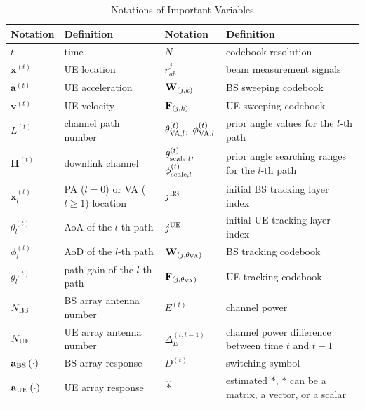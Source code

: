 \documentclass[journal,12pt,onecolumn,draftclsnofoot,]{IEEEtran}
\begin{document}
\begin{table}[]
\caption{\color{black}Notations of Important Variables}\vspace{-6mm}
\label{table1}
\vspace{-2mm}
\center
\begin{tabular}{|l|l|l|l|}
\hline
Notation & Definition & Notation & Definition \\ \hline
$t$ & time & $N$ & codebook resolution \\ \hline
${\mathbf{x}^{\left({{t} } \right)}}$ & UE location & ${{r}}_{ab}^j$ & beam measurement signals \\ \hline
${\mathbf{a}^{\left({{t} } \right)}}$ & UE acceleration & ${{{\bf{W}}_{({j,k} )}}}$ & BS sweeping codebook \\ \hline
${\mathbf{v}^{\left({{t} } \right)}}$ & UE velocity & ${{{\bf{F}}_{({j,k} )}}}$ & UE sweeping codebook \\ \hline
${L^{(t)}}$ & channel path number & $\theta _{{\rm{VA}},l}^{(t )},$ $\phi _{{\rm{VA}},l}^{(t )}$ & prior angle values for the $l$-th path \\ \hline
$\mathbf{H}^{(t)}$ & downlink channel & $\theta _{{\rm{scale}},l}^{(t )},$ $\phi _{{\rm{scale}},l}^{(t )}$ & prior angle searching ranges for the $l$-th path \\ \hline
$\mathbf{x}_l^{(t)}$ & PA ($l=0$) or VA ($l \ge 1$) location & ${j^{\rm BS}}$ & initial BS tracking layer index \\ \hline
${\theta _l^{(t)}}$ & AoA of the $l$-th path & $ {j^{\rm UE}}$ & initial UE tracking layer index \\ \hline
${\phi _l^{(t)}}$ & AoD of the $l$-th path & $ {{{\bf{W}}_{({j,{\theta_{\rm VA}}} )}}}$ & BS tracking codebook \\ \hline
${g_l^{(t)}}$ & path gain of the $l$-th path & $ {{{\bf{F}}_{({j,{\theta_{\rm VA}}} )}}}$ & UE tracking codebook \\ \hline
${N_{\rm BS}}$ & BS array antenna number & ${E^{(t )}}$ & channel power \\ \hline
${{N_{\rm UE}}}$ & UE array antenna number & $\Delta _E^{({t,t - 1} )}$ & channel power difference between time $t$ and $t-1$ \\ \hline
${\mathbf{a}_{\rm BS}}\left(\cdot \right)$ & BS array response & ${D^{(t)}} $ & switching symbol \\ \hline
${\mathbf{a}_{\rm UE}}\left(\cdot \right)$ & UE array response & $\hat *$ & estimated $*$, $*$ can be a matrix, a vector, or a scalar \\ \hline
\end{tabular}
\vspace{-4mm}
\end{table}
\end{document}
